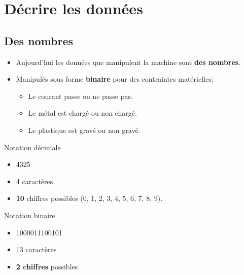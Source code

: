 \section[Décrire]{Décrire les données}
\subsection{Des nombres}

\begin{slide}
	\begin{itemize}
		\item Aujourd'hui les données que manipulent la machine sont \textbf{des nombres}.
		\item Manipulés sous forme \textbf{binaire} pour des contraintes matérielles:
			\begin{itemize}
				\item Le courant passe ou ne passe pas.
				\item Le métal est chargé ou non chargé.
				\item Le plastique est gravé ou non gravé.
			\end{itemize}  
	\end{itemize}
\end{slide}

\begin{slide}
\begin{exampleblock}{Notation décimale}
  \begin{itemize}
    \item 4325
    \item 4 caractères
    \item \textbf{10} chiffres possibles (0, 1, 2, 3, 4, 5, 6, 7, 8, 9).
  \end{itemize}
\end{exampleblock}

\begin{exampleblock}{Notation binaire}
  \begin{itemize}
    \item 1000011100101
    \item 13 caractères
    \item \textbf{2 chiffres} possibles
  \end{itemize}
\end{exampleblock}
\end{slide}



